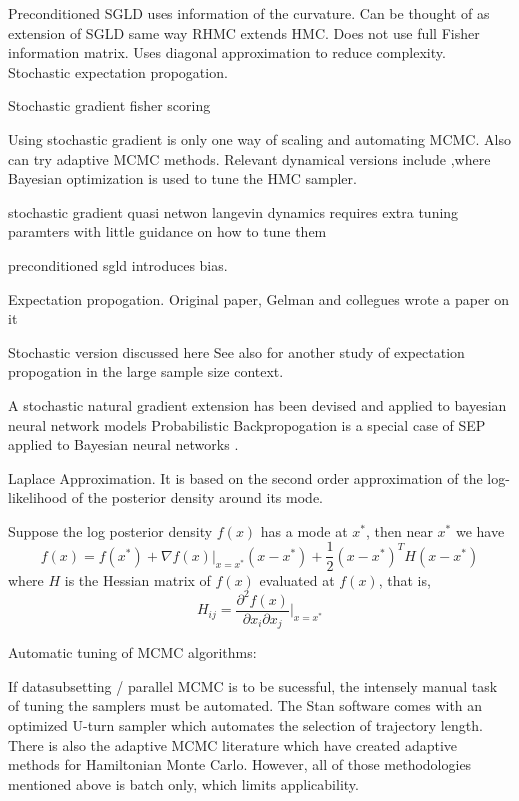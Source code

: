 \documentclass{book}
\begin{document}
\begin{enumerate}
Preconditioned SGLD \cite{li2015preconditioned} uses information of the curvature. Can be thought of as extension of SGLD same way RHMC extends HMC. Does not use full Fisher information matrix. Uses diagonal approximation to reduce complexity.
Stochastic expectation propogation.

Stochastic gradient fisher scoring \cite{ahn2012bayesian}

Using stochastic gradient is only one way of scaling and automating MCMC. Also can try adaptive MCMC methods\cite{roberts2009examples}. Relevant dynamical versions include \cite{wang2013adaptive},where Bayesian optimization \cite{mahendran2012adaptive,snoek2012practicalx,} is used to tune the HMC sampler.

stochastic gradient quasi netwon langevin dynamics requires extra tuning paramters with little guidance on how to tune them \cite{csimcsekli2016stochastic}

preconditioned sgld introduces bias\cite{li2015preconditioned}.

Expectation propogation. Original paper\cite{minka2001expectation}, Gelman and collegues wrote a paper on it \cite{gelman2014expectation}

Stochastic version discussed here \cite{li2015stochastic}
See also \cite{dehaene2015expectation} for another study of expectation propogation in the large sample size context. 

A stochastic natural gradient extension has been devised and applied to bayesian neural network models \cite{teh2015distributed}
Probabilistic Backpropogation is a special case of SEP applied to Bayesian neural networks \cite{hernandez2015probabilistic}.


Laplace Approximation. It is based on the second order approximation of the
log-likelihood of the posterior density around its mode.

Suppose the log posterior density $f(x)$ has a mode at $x^*$, then near $x^*$ we
have 
\[ f(x) = f(x^*) + \nabla f(x)|_{x=x^*} (x-x^*) + \frac{1}{2} (x-x^*)^TH(x-x^*)
\]
where $H$ is the Hessian matrix of $f(x)$ evaluated at $f(x)$, that is,
\[ H_{ij} = \frac{\partial^2 f(x)}{\partial x_i \partial x_j }|_{x=x^*} \]

Automatic tuning of MCMC algorithms:

If datasubsetting / parallel MCMC is to be sucessful, the intensely manual task of tuning the samplers must be automated. The Stan software comes with an optimized U-turn sampler \cite{} which automates the selection of trajectory length. There is also the adaptive MCMC literature which have created adaptive methods for Hamiltonian Monte Carlo. However, all of those methodologies mentioned above is batch only, which limits applicability. 


\end{enumerate}
\end{document}
